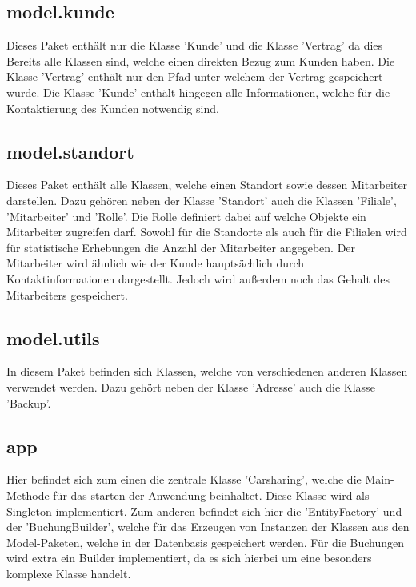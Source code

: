 \subsection{model.kunde}

Dieses Paket enthält nur die Klasse 'Kunde' und die Klasse 'Vertrag' da dies Bereits alle Klassen sind, welche einen direkten Bezug zum Kunden haben.
Die Klasse 'Vertrag' enthält nur den Pfad unter welchem  der Vertrag gespeichert wurde. Die Klasse 'Kunde' enthält hingegen alle Informationen, welche für die Kontaktierung des Kunden notwendig sind.

\subsection{model.standort}

Dieses Paket enthält alle Klassen, welche einen Standort sowie dessen Mitarbeiter darstellen. Dazu gehören neben der Klasse 'Standort' auch die Klassen 'Filiale', 'Mitarbeiter' und 'Rolle'. Die Rolle definiert dabei auf welche Objekte ein Mitarbeiter zugreifen darf. Sowohl für die Standorte als auch für die Filialen wird für statistische Erhebungen die Anzahl der Mitarbeiter angegeben. Der Mitarbeiter wird ähnlich wie der Kunde hauptsächlich durch Kontaktinformationen dargestellt. Jedoch wird außerdem noch das Gehalt des Mitarbeiters gespeichert.

\subsection{model.utils}

In diesem Paket befinden sich Klassen, welche von verschiedenen anderen Klassen verwendet werden. Dazu gehört neben der Klasse 'Adresse' auch die Klasse 'Backup'.

\subsection{app}

Hier befindet sich zum einen die zentrale Klasse 'Carsharing', welche die Main-Methode für das starten der Anwendung beinhaltet. Diese Klasse wird als Singleton implementiert. Zum anderen befindet sich hier die 'EntityFactory' und der 'BuchungBuilder', welche für das Erzeugen von Instanzen der Klassen aus den Model-Paketen, welche in der Datenbasis gespeichert werden. Für die Buchungen wird extra ein Builder implementiert, da es sich hierbei um eine besonders komplexe Klasse handelt. 

